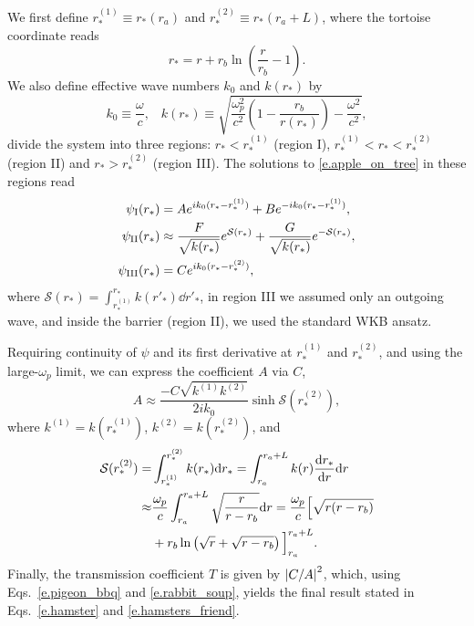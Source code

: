 \documentclass[prd,aps,twocolumn,amsfonts,showpacs,superscriptaddress,preprintnumbers,nofootinbib]{revtex4-2}
\begin{document}
We first define $r_*^{(1)}\equiv r_*(r_a)$ and $r_*^{(2)}\equiv r_*(r_a+L)$, where the tortoise coordinate reads
\begin{equation}
    r_*=r+r_b\ln\left(\frac{r}{r_b}-1\right).
\end{equation}
We also define effective wave numbers $k_0$ and $k(r_*)$ by
\begin{equation}
    k_0\equiv\frac{\omega}{c},\,\,\,\,\,k(r_*)\equiv\sqrt{\frac{\omega_p^2}{c^2}\left(1-\frac{r_b}{r(r_*)}\right)-\frac{\omega^2}{c^2}},
\end{equation}
divide the system into three regions: $r_*<r_*^{(1)}$ (region I), $r_*^{(1)}<r_*<r_*^{(2)}$ (region II) and $r_*>r_*^{(2)}$ (region III). The solutions to \eqref{e.apple_on_tree} in these regions read
\begin{align}
    \psi_{\rm I}(r_*)&=Ae^{ik_0(r_*-r_*^{(1)})}+Be^{-ik_0(r_*-r_*^{(1)})},\\
    \psi_{\rm II}(r_*)&\approx \frac{F}{\sqrt{k(r_*)}}e^{\mathcal{S}(r_*)}+\frac{G}{\sqrt{k(r_*)}}e^{-\mathcal{S}(r_*)},\\
    \psi_{\rm III}(r_*)&=Ce^{ik_0(r_*-r_*^{(2)})},   
\end{align}
where $\mathcal{S}(r_*)=\int_{r_*^{(1)}}^{r_*}k(r'_*)\dd r'_*$, in region III we assumed only an outgoing wave, and inside the barrier (region II), we used the standard WKB ansatz. 

Requiring continuity of $\psi$ and its first derivative at $r_*^{(1)}$ and $r_*^{(2)}$, and using the large-$\omega_p$ limit, we can express the coefficient $A$ via $C$,
\begin{equation}\label{e.pigeon_bbq}
    A\approx\frac{-C\sqrt{k^{(1)}k^{(2)}}}{2ik_0}\sinh{\mathcal{S}(r_*^{(2)})},
\end{equation}
where $k^{(1)}=k(r_*^{(1)})$, $k^{(2)}=k(r_*^{(2)})$, and
\begin{equation}\label{e.rabbit_soup}
\begin{split}
    \mathcal{S}(r_*^{(2)})=&\int_{r_*^{(1)}}^{r_*^{(2)}}k(r_*)\dd r_*=\int_{r_a}^{r_a+L}k(r)\dv{r_*}{r}\dd r\\
    \approx&\frac{\omega_p}{c}\int_{r_a}^{r_a+L}\sqrt{\frac{r}{r-r_b}}\dd r=\frac{\omega_p}{c}\Big[ \sqrt{r(r-r_b)}\\
    &+r_b \ln\left(\sqrt{r} + \sqrt{r-r_b}\right) \Big]_{r_a}^{r_a+L}.
\end{split}
\end{equation}
Finally, the transmission coefficient $T$ is given by $\abs{C/A}^2$, which, using Eqs.~\eqref{e.pigeon_bbq} and \eqref{e.rabbit_soup}, yields the final result stated in Eqs.~\eqref{e.hamster} and \eqref{e.hamsters_friend}.




\end{document}
